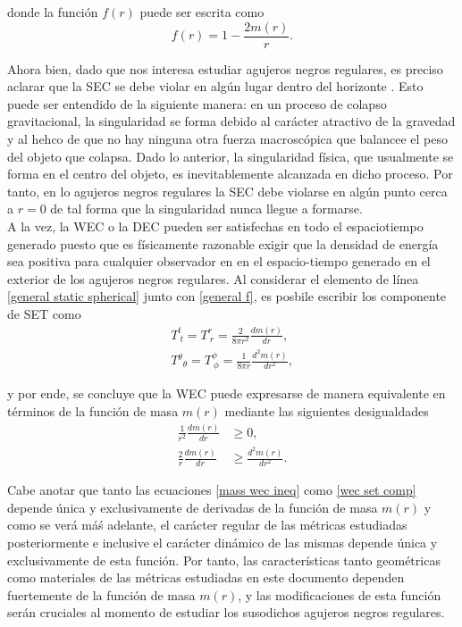 \documentclass[16pt,a4paper]{article}
\numberwithin{equation}{section}
\theoremstyle{definition}
\begin{document}
donde la función $f(r)$ puede ser escrita como
\begin{equation}
\label{general f}
f(r) = 1 - \frac{2m(r)}{r}.
\end{equation}

Ahora bien, dado que nos interesa estudiar agujeros negros regulares, es preciso aclarar que la SEC se debe violar en algún lugar dentro del horizonte \cite{zaslavskii}. Esto puede ser entendido de la siguiente manera: en un proceso de colapso gravitacional, la singularidad se forma debido al carácter atractivo de la gravedad y al hehco de que no hay ninguna otra fuerza macroscópica que balancee el peso del objeto que colapsa. Dado lo anterior, la singularidad física, que usualmente se forma en el centro del objeto, es inevitablemente alcanzada en dicho proceso. Por tanto, en lo agujeros negros regulares la SEC debe violarse en algún punto cerca a $r = 0$ de tal forma que la singularidad nunca llegue a formarse.\\

A la vez, la WEC o la DEC pueden ser satisfechas en todo el espaciotiempo generado \cite{dymnikova2004} puesto que es físicamente razonable exigir que la densidad de energía sea positiva para cualquier observador en en el espacio-tiempo generado en el exterior de los agujeros negros regulares. Al considerar el elemento de línea \eqref{general static spherical} junto con \eqref{general f}, es posbile escribir los componente de SET como \cite{vanegas-weak} 
\begin{equation}
\label{wec set comp}
\begin{aligned}
T^{t}_{\ t} = T^{r}_{\ r} = \frac{2}{8 \pi r^2} \frac{dm(r)}{dr},\\ T{^\theta}_{\theta} = T^{\phi}_{\ \phi} = \frac{1}{8 \pi r} \frac{d^2m(r)}{dr^2},
\end{aligned}
\end{equation}

y por ende, se concluye que la WEC puede expresarse de manera equivalente en términos de la función de masa $m(r)$ mediante las siguientes desigualdades
\begin{equation}
\label{mass wec ineq}
\begin{aligned}
\frac{1}{r^2}\frac{dm(r)}{dr} &\geq 0,\\
\frac{2}{r}\frac{dm(r)}{dr} &\geq \frac{d^2m(r)}{dr^2}.
\end{aligned}
\end{equation}

Cabe anotar que tanto las ecuaciones \eqref{mass wec ineq} como \eqref{wec set comp} depende única y exclusivamente de derivadas de la función de masa $m(r)$ y como se verá máś adelante, el carácter regular de las métricas estudiadas posteriormente e inclusive el carácter dinámico de las mismas depende única y exclusivamente de esta función. Por tanto, las características tanto geométricas como materiales de las métricas estudiadas en este documento dependen fuertemente de la función de masa $m(r)$, y las modificaciones de esta función serán cruciales al momento de estudiar los susodichos agujeros negros regulares.\\
\end{document}
